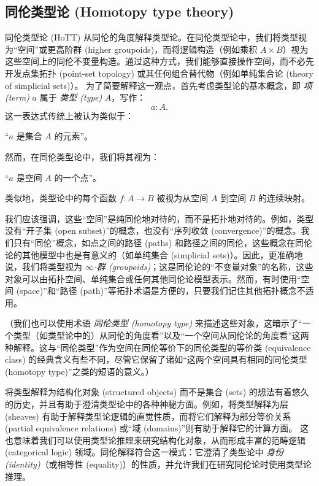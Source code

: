 \subsection*{同伦类型论 (Homotopy type theory)}

同伦类型论 (HoTT) 从同伦的角度解释类型论。在同伦类型论中，我们将类型视为“空间”或更高阶群 (higher groupoids)，而将逻辑构造（例如乘积 $A\times B$）视为这些空间上的同伦不变量构造。通过这种方式，我们能够直接操作空间，而不必先开发点集拓扑 (point-set topology) 或其任何组合替代物（例如单纯集合论 (theory of simplicial sets)）。
为了简要解释这一观点，首先考虑类型论的基本概念，即 \emph{项 (term)} $a$ 属于 \emph{类型 (type)} $A$，写作：
\[ a:A. \]
这一表达式传统上被认为类似于：
\begin{center}
    “$a$ 是集合 $A$ 的元素”。
\end{center}
然而，在同伦类型论中，我们将其视为：
\begin{center}
    “$a$ 是空间 $A$ 的一个点”。
\end{center}
类似地，类型论中的每个函数 $f : A\to B$ 被视为从空间 $A$ 到空间 $B$ 的连续映射。

我们应该强调，这些“空间”是纯同伦地对待的，而不是拓扑地对待的。例如，类型没有“开子集 (open subset)”的概念，也没有“序列收敛 (convergence)”的概念。我们只有“同伦”概念，如点之间的路径 (paths) 和路径之间的同伦，这些概念在同伦论的其他模型中也是有意义的（如单纯集合 (simplicial sets)）。因此，更准确地说，我们将类型视为 \emph{$\infty$-群 (groupoids)}；这是同伦论的“不变量对象”的名称，这些对象可以由拓扑空间、单纯集合或任何其他同伦论模型表示。然而，有时使用“空间 (space)”和“路径 (path)”等拓扑术语是方便的，只要我们记住其他拓扑概念不适用。

（我们也可以使用术语 \emph{同伦类型 (homotopy type)} 来描述这些对象，这暗示了“一个类型（如类型论中的）从同伦的角度看”以及“一个空间从同伦论的角度看”这两种解释。这与“同伦类型”作为空间在同伦等价下的同伦类型的等价类 (equivalence class) 的经典含义有些不同，尽管它保留了诸如“这两个空间具有相同的同伦类型 (homotopy type)”之类的短语的意义。）

将类型解释为结构化对象 (structured objects) 而不是集合 (sets) 的想法有着悠久的历史，并且有助于澄清类型论中的各种神秘方面。例如，将类型解释为层 (sheaves) 有助于解释类型论逻辑的直觉性质，而将它们解释为部分等价关系 (partial equivalence relations) 或“域 (domains)”则有助于解释它的计算方面。
这也意味着我们可以使用类型论推理来研究结构化对象，从而形成丰富的范畴逻辑 (categorical logic) 领域。同伦解释符合这一模式：它澄清了类型论中 \emph{身份 (identity)}（或相等性 (equality)）的性质，并允许我们在研究同伦论时使用类型论推理。

